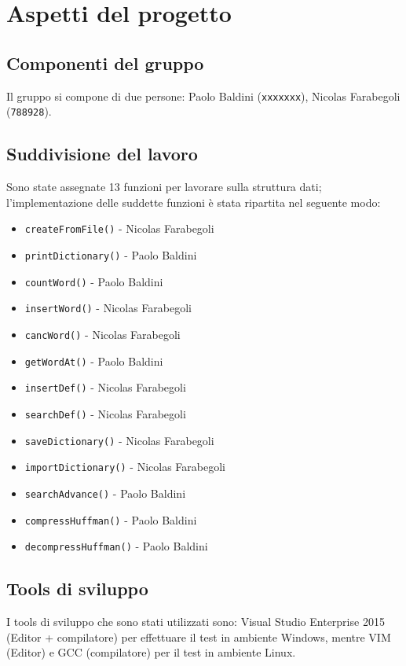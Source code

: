\documentclass[paper=a4, fontsize=11pt,twoside]{scrartcl}   %
\begin{document}
		\section{Aspetti del progetto}
			\subsection{Componenti del gruppo}
				Il gruppo si compone di due persone: Paolo Baldini (\texttt{xxxxxxx}), Nicolas Farabegoli (\texttt{788928}).
			\subsection{Suddivisione del lavoro}
				Sono state assegnate 13 funzioni per lavorare sulla struttura dati; l'implementazione delle suddette funzioni è stata ripartita nel seguente modo:
				\begin{itemize}
					\item \texttt{createFromFile()} - Nicolas Farabegoli
					\item \texttt{printDictionary()} - Paolo Baldini
					\item \texttt{countWord()} - Paolo Baldini
					\item \texttt{insertWord()} - Nicolas Farabegoli
					\item \texttt{cancWord()} - Nicolas Farabegoli
					\item \texttt{getWordAt()} - Paolo Baldini
					\item \texttt{insertDef()} - Nicolas Farabegoli
					\item \texttt{searchDef()} - Nicolas Farabegoli
					\item \texttt{saveDictionary()} - Nicolas Farabegoli
					\item \texttt{importDictionary()} - Nicolas Farabegoli
					\item \texttt{searchAdvance()} - Paolo Baldini
					\item \texttt{compressHuffman()} - Paolo Baldini
					\item \texttt{decompressHuffman()} - Paolo Baldini			
				\end{itemize}
			 
			 \subsection{Tools di sviluppo}
			 	I tools di sviluppo che sono stati utilizzati sono: Visual Studio Enterprise 2015 (Editor + compilatore) per effettuare il test in ambiente Windows, mentre VIM (Editor) e GCC (compilatore) per il test in ambiente Linux.
			 	
\end{document}

